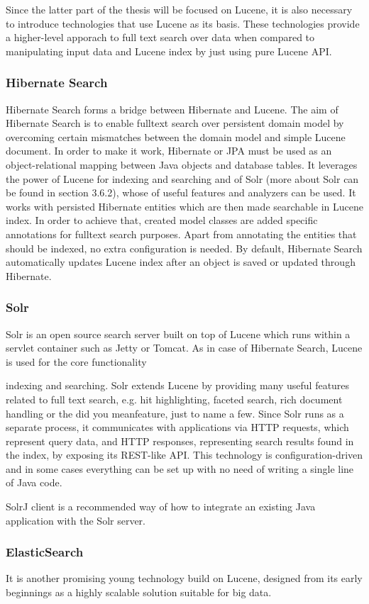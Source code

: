 Since the latter part of the thesis will be focused on Lucene, it
is also necessary to introduce technologies that use Lucene as its
basis. These technologies provide a higher-level apporach to full
text search over data when compared to manipulating input data and
Lucene index by just using pure Lucene API.


\subsubsection{Hibernate Search}

Hibernate Search \cite{HibernateSearchHome} forms a bridge between
Hibernate and Lucene. The aim of Hibernate Search is to enable fulltext
search over persistent domain model by overcoming certain mismatches
between the domain model and simple Lucene document. In order to make
it work, Hibernate or JPA must be used as an object-relational mapping
between Java objects and database tables. It leverages the power of
Lucene for indexing and searching and of Solr (more about Solr can
be found in section 3.6.2), whose of useful features and analyzers
can be used. It works with persisted Hibernate entities which are
then made searchable in Lucene index. In order to achieve that, created
model classes are added specific annotations for fulltext search purposes.
Apart from annotating the entities that should be indexed, no extra
configuration is needed. By default, Hibernate Search automatically
updates Lucene index after an object is saved or updated through Hibernate.


\subsubsection{Solr}

Solr \cite{SolrHome} is an open source search server built on top
of Lucene which runs within a servlet container such as Jetty or Tomcat.
As in case of Hibernate Search, Lucene is used for the core functionality

indexing and searching. Solr extends Lucene by providing
many useful features related to full text search, e.g. hit highlighting,
faceted search, rich document handling or the did you
meanfeature, just to name a few. Since Solr runs
as a separate process, it communicates with applications via HTTP
requests, which represent query data, and HTTP responses, representing
search results found in the index, by exposing its REST-like API.
This technology is configuration-driven and in some cases everything
can be set up with no need of writing a single line of Java code. 

SolrJ client is a recommended way of how to integrate an existing
Java application with the Solr server.


\subsubsection{ElasticSearch}

It is another promising young technology build on Lucene, designed from its early beginnings as a highly scalable solution suitable for big data.
